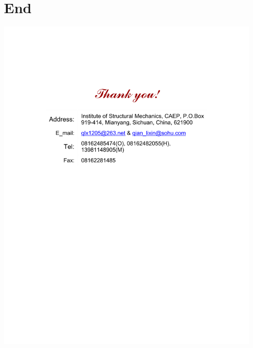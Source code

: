 \documentclass[slidestop,compress,mathserif,UTF8]{beamer}
\numberwithin{equation}{section}
\begin{document}
    \section*{End}
        \begin{frame}
            \vspace{35mm}
            \centering
                \includegraphics{Thanks.pdf}
        \end{frame}
\end{document}
